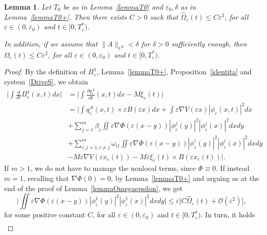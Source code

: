\documentclass[11pt]{amsart}
\numberwithin{equation}{section}
\newtheorem{lemma}[theorem]{Lemma}
\theoremstyle{definition}
\begin{document}
\begin{lemma}\label{OOmega}
Let $T_0$ be as in Lemma~\ref{lemmaT0} and ${\varepsilon}_0,\delta$ as in Lemma~\ref{lemmaT0+}. Then
there exists $C>0$ such that $\hat\Omega_{\varepsilon}(t)\leq C{\varepsilon}^2$, for all ${\varepsilon}\in (0,{\varepsilon}_0)$
and $t\in [0,T_{\varepsilon}^{*})$.

\noindent
In addition, if we assume that $\|A\|_{C^2}<\delta$ for $\delta>0$ sufficiently enough,
then $\Omega_{\varepsilon}(t)\leq C{\varepsilon}^2$, for all ${\varepsilon}\in (0,{\varepsilon}_0)$
and $t\in [0,T_{\varepsilon}^{*})$.
\end{lemma}
\begin{proof}
By the definition of $\Pi^1_{\varepsilon}$, Lemma~\ref{lemmaT0+},
Proposition~\ref{identita} and system~\eqref{DriveS}, we obtain
\begin{align*}
\Big|\int \frac{d}{dt}\Pi^1_{\varepsilon}(x,t)dx\Big| &
=\Big|\int \frac{\partial q^A_{\varepsilon}}{\partial t}(x,t)dx-M\dot \xi_{\varepsilon}(t)\Big| \\
& =\Big|\int q_{\varepsilon}^A(x,t)\times {\varepsilon} B({\varepsilon} x)dx+\int {\varepsilon}\nabla V({\varepsilon} x)|\phi_{\varepsilon}(x,t)|^{2}dx \\
& +\sum_{j=1}^m\beta_j\iint {\varepsilon}\nabla\Phi({\varepsilon}(x-y))|\phi_{\varepsilon}^j(y)|^2|\phi_{\varepsilon}^j(x)|^2dxdy\\
& +\sum_{i,j=1, i\neq j}^m\omega_{ij}\iint {\varepsilon}\nabla\Phi({\varepsilon}(x-y))|\phi_{\varepsilon}^i(y)|^2|\phi_{\varepsilon}^j(x)|^2dxdy\\
& -M{\varepsilon}\nabla V({\varepsilon} x_{\varepsilon}(t))-M{\varepsilon}\xi_{\varepsilon}(t)\times B({\varepsilon} x_{\varepsilon}(t))\Big|.
\end{align*}
If $m>1$, we do not have to manage the nonlocal terms, since $\Phi\equiv 0$. If instead $m=1$,
recalling that $\nabla \Phi(0)=0$, by Lemma~\ref{lemmaT0+}
and arguing as at the end of the proof of Lemma~\ref{lemmaOmegaepsilon}, we get
\begin{equation}
	\label{estsmm0}
\Big|\iint {\varepsilon}\nabla \Phi({\varepsilon}(x-y))|\phi_{\varepsilon}^1(y)|^2|\phi_{\varepsilon}^1(x)|^2dx dy\Big|
\leq {\varepsilon}\big[ C\hat\Omega_{\varepsilon}(t)+{\mathcal O}({\varepsilon}^2) \big],
\end{equation}
for some positive constant $C$,
for all ${\varepsilon}\in(0,{\varepsilon}_{0})$ and $t\in [0,T_{\varepsilon}^{*})$. In turn, it holds
\begin{align}

\end{align}
\end{proof}
\end{document}

